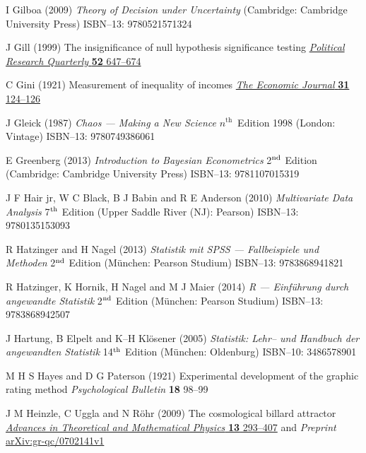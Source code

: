 \begin{thebibliography}{99}
I Gilboa
(2009) \textit{Theory of Decision under Uncertainty}
(Cambridge: Cambridge University Press)
ISBN--13: 9780521571324

J Gill
(1999) The insignificance of null hypothesis significance testing 
\href{https://doi.org/10.1177/106591299905200309}{\textit{Political 
Research Quarterly} \textbf{52} 647--674}

C Gini
(1921) Measurement of inequality of incomes
\href{http://dx.doi.org/10.2307/2223319}{\textit{The Economic 
Journal} \textbf{31} 124--126}

J Gleick
(1987) \textit{Chaos --- Making a New Science}
$n^{\text{th}}$~Edition 1998 (London: Vintage)
ISBN--13: 9780749386061

E Greenberg
(2013) \textit{Introduction to Bayesian Econometrics}
2$^{\rm nd}$ Edition (Cambridge: Cambridge University Press) 
ISBN--13: 9781107015319

J F Hair jr, W C Black, B J Babin and R E Anderson
(2010) \textit{Multivariate Data Analysis} 7$^{\rm th}$ Edition 
(Upper Saddle River (NJ): Pearson) ISBN--13: 9780135153093

R Hatzinger and H Nagel
(2013) \textit{Statistik mit SPSS --- Fallbeispiele und Methoden}
2$^{\rm nd}$ Edition (M\"unchen: Pearson Studium) ISBN--13: 
9783868941821

R Hatzinger, K Hornik, H Nagel and M J Maier
(2014) \textit{R --- Einf\"{u}hrung durch angewandte Statistik}
2$^{\rm nd}$ Edition (M\"unchen: Pearson Studium) ISBN--13: 
9783868942507

J Hartung, B Elpelt and K--H Kl\"osener
(2005) \textit{Statistik: Lehr-- und Handbuch der angewandten
Statistik} 14$^{\rm th}$ Edition (M\"unchen: Oldenburg)
ISBN--10: 3486578901

M H S Hayes and D G Paterson
(1921) Experimental development of the graphic rating method
\textit{Psychological Bulletin} \textbf{18} 98--99

J M Heinzle, C Uggla and N R\"{o}hr
(2009) The cosmological billard attractor
\href{http://dx.doi.org/10.4310/ATMP.2009.v13.n2.a1}{\textit{Advances in Theoretical and Mathematical Physics} \textbf{13} 
293--407} and \textit{Preprint} 
\href{http://arxiv.org/abs/gr-qc/0702141}{arXiv:gr-qc/0702141v1}


\end{thebibliography}
